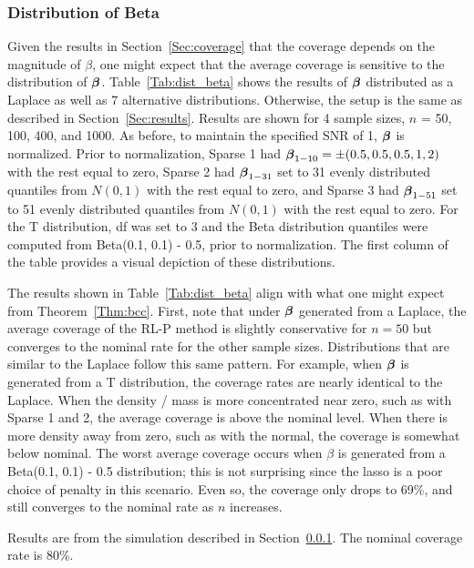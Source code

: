 \subsubsection{Distribution of Beta} \label{Sec:distribution}

Given the results in Section~\ref{Sec:coverage} that the coverage depends on the magnitude of $\beta$, one might expect that the average coverage is sensitive to the distribution of $\boldsymbol{\beta}$. Table~\ref{Tab:dist_beta} shows the results of $\boldsymbol{\beta}$ distributed as a Laplace as well as 7 alternative distributions. Otherwise, the setup is the same as described in Section~\ref{Sec:results}. Results are shown for 4 sample sizes, $n$ = 50, 100, 400, and 1000. As before, to maintain the specified SNR of 1, $\boldsymbol{\beta}$ is normalized. Prior to normalization, Sparse 1 had $\boldsymbol{\beta}_{1-10} = \pm(0.5, 0.5, 0.5, 1, 2)$ with the rest equal to zero, Sparse 2 had $\boldsymbol{\beta}_{1-31}$ set to 31 evenly distributed quantiles from $N(0, 1)$ with the rest equal to zero, and Sparse 3 had $\boldsymbol{\beta}_{1-51}$ set to 51 evenly distributed quantiles from $N(0, 1)$ with the rest equal to zero. For the T distribution, df was set to 3 and the Beta distribution quantiles were computed from Beta(0.1, 0.1) - 0.5, prior to normalization. The first column of the table provides a visual depiction of these distributions.

The results shown in Table~\ref{Tab:dist_beta} align with what one might expect from Theorem~\ref{Thm:bcc}. First, note that under $\boldsymbol{\beta}$ generated from a Laplace, the average coverage of the RL-P method is slightly conservative for $n=50$ but converges to the nominal rate for the other sample sizes. Distributions that are similar to the Laplace follow this same pattern. For example, when $\boldsymbol{\beta}$ is generated from a T distribution, the coverage rates are nearly identical to the Laplace. When the density / mass is more concentrated near zero, such as with Sparse 1 and 2, the average coverage is above the nominal level. When there is more density away from zero, such as with the normal, the coverage is somewhat below nominal. The worst average coverage occurs when $\beta$ is generated from a Beta(0.1, 0.1) - 0.5 distribution; this is not surprising since the lasso is a poor choice of penalty in this scenario. Even so, the coverage only drops to 69\%, and still converges to the nominal rate as $n$ increases.

\begin{table}[htb!]
  \centering
  
  \caption{\label{Tab:dist_beta} Results are from the simulation described in Section~\ref{Sec:distribution}. The nominal coverage rate is 80\%.}
\end{table}

